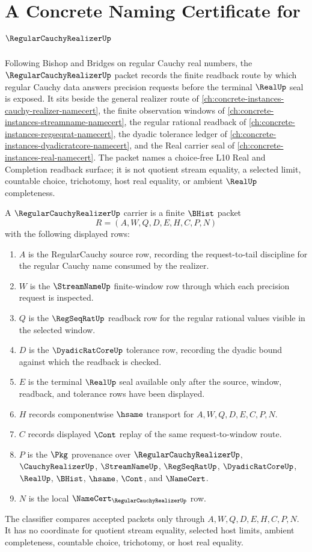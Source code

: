 \chapter{A Concrete Naming Certificate for $\RegularCauchyRealizerUp$}
\label{ch:concrete-instances-regular-cauchy-realizer-namecert}

Following Bishop and Bridges on regular Cauchy real numbers, the $\RegularCauchyRealizerUp$ packet records the finite readback route by which regular Cauchy data answers precision requests before the terminal $\RealUp$ seal is exposed. It sits beside the general realizer route of \autoref{ch:concrete-instances-cauchy-realizer-namecert}, the finite observation windows of \autoref{ch:concrete-instances-streamname-namecert}, the regular rational readback of \autoref{ch:concrete-instances-regseqrat-namecert}, the dyadic tolerance ledger of \autoref{ch:concrete-instances-dyadicratcore-namecert}, and the Real carrier seal of \autoref{ch:concrete-instances-real-namecert}. The packet names a choice-free L10 Real and Completion readback surface; it is not quotient stream equality, a selected limit, countable choice, trichotomy, host real equality, or ambient $\RealUp$ completeness.

\begin{definition}
\label{def:regular-cauchy-realizer-carrier}
A $\RegularCauchyRealizerUp$ carrier is a finite $\BHist$ packet
$$
R=(A,W,Q,D,E,H,C,P,N)
$$
with the following displayed rows:
\begin{enumerate}
\item $A$ is the RegularCauchy source row, recording the request-to-tail discipline for the regular Cauchy name consumed by the realizer.
\item $W$ is the $\StreamNameUp$ finite-window row through which each precision request is inspected.
\item $Q$ is the $\RegSeqRatUp$ readback row for the regular rational values visible in the selected window.
\item $D$ is the $\DyadicRatCoreUp$ tolerance row, recording the dyadic bound against which the readback is checked.
\item $E$ is the terminal $\RealUp$ seal available only after the source, window, readback, and tolerance rows have been displayed.
\item $H$ records componentwise $\hsame$ transport for $A,W,Q,D,E,C,P,N$.
\item $C$ records displayed $\Cont$ replay of the same request-to-window route.
\item $P$ is the $\Pkg$ provenance over $\RegularCauchyRealizerUp$, $\CauchyRealizerUp$, $\StreamNameUp$, $\RegSeqRatUp$, $\DyadicRatCoreUp$, $\RealUp$, $\BHist$, $\hsame$, $\Cont$, and $\NameCert$.
\item $N$ is the local $\NameCert_{\RegularCauchyRealizerUp}$ row.
\end{enumerate}
The classifier compares accepted packets only through $A,W,Q,D,E,H,C,P,N$. It has no coordinate for quotient stream equality, selected host limits, ambient completeness, countable choice, trichotomy, or host real equality.
\end{definition}

